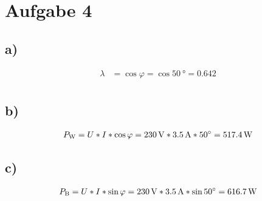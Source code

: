 \documentclass[../../document.tex]{subfiles}
\begin{document}
\section*{Aufgabe 4}

\subsection*{a)}

\begin{equation*}
    \begin{split}
        \lambda &= \cos{\varphi} = \cos{\SI{50}{\degree}} = \num{0.642}\\
    \end{split}
\end{equation*}

\subsection*{b)}

\begin{equation*}
    \begin{split}
        P_{\textrm{W}} &= U * I * \cos{\varphi} = \SI{230}{\volt} * \SI{3,5}{\ampere} * \SI{50}{\degree} = \SI{517,4}{\watt}\\
    \end{split}
\end{equation*}

\subsection*{c)}

\begin{equation*}
    \begin{split}
        P_{\textrm{B}} &= U * I * \sin{\varphi} = \SI{230}{\volt} * \SI{3,5}{\ampere} * \sin{\SI{50}{\degree}} = \SI{616,7}{\watt}\\
    \end{split}
\end{equation*}
\end{document}
